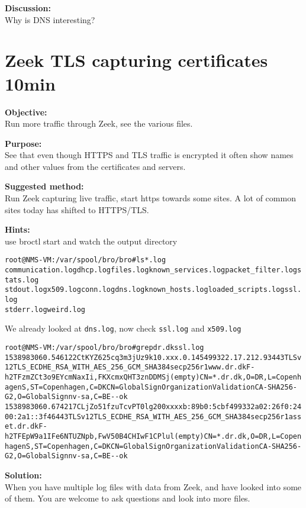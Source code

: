 \documentclass[a4paper,11pt,notitlepage]{report}
\begin{document}
{\bf Discussion:}\\
Why is DNS interesting?


\chapter{Zeek TLS capturing certificates 10min}
\label{ex:zeektlsbasic}


{\bf Objective:} \\
Run more traffic through Zeek, see the various files.


{\bf Purpose:}\\
See that even though HTTPS and TLS traffic is encrypted it often show names and other values from the certificates and servers.


{\bf Suggested method:}\\
Run Zeek capturing live traffic, start https towards some sites. A lot of common sites today has shifted to HTTPS/TLS.


{\bf Hints:}\\
use broctl start and watch the output directory

\begin{alltt}\small
root@NMS-VM:/var/spool/bro/bro# ls *.log
communication.log  dhcp.log files.log known_services.log packet_filter.log  stats.log
stdout.log x509.log conn.log dns.log known_hosts.log loaded_scripts.log  ssl.log
stderr.log weird.log
\end{alltt}

We already looked at \verb+dns.log+, now check \verb+ssl.log+ and \verb+x509.log+

\begin{alltt}\small
root@NMS-VM:/var/spool/bro/bro# grep dr.dk ssl.log
1538983060.546122	CtKYZ625cq3m3jUz9k	10.xxx.0.145	49932	2.17.212.93	443	TLSv12	TLS_ECDHE_RSA_WITH_AES_256_GCM_SHA384	secp256r1	www.dr.dk	F	-	h2	T	FzmZCt3o9EYcmNaxIi,FKXcmxQHT3znDDMSj	(empty)	CN=*.dr.dk,O=DR,L=Copenhagen S,ST=Copenhagen,C=DK	CN=GlobalSign Organization Validation CA - SHA256 - G2,O=GlobalSign nv-sa,C=BE	-	-	ok
1538983060.674217	CLjZo51fzuTcvPT0lg	200xxxxb:89b0:5cbf	49933	2a02:26f0:2400:2a1::3f46	443	TLSv12	TLS_ECDHE_RSA_WITH_AES_256_GCM_SHA384	secp256r1	asset.dr.dk	F	-	h2	TFEpW9a1IFe6NTUZNpb,FwV50B4CHIwF1CPlul	(empty)	CN=*.dr.dk,O=DR,L=Copenhagen S,ST=Copenhagen,C=DK	CN=GlobalSign Organization Validation CA - SHA256 - G2,O=GlobalSign nv-sa,C=BE	-	-	ok
\end{alltt}

{\bf Solution:}\\
When you have multiple log files with data from Zeek, and have looked into some of them. You are welcome to ask questions and look into more files.
\end{document}
